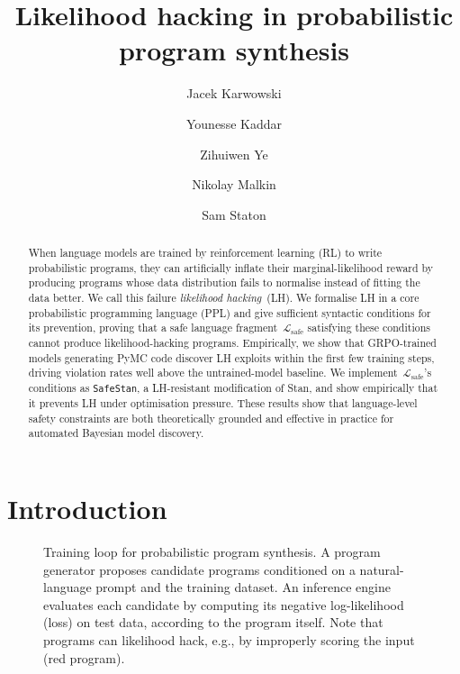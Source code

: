 \documentclass[preprint]{uai2026} %
\title{Likelihood hacking in probabilistic program synthesis}
\author[1]{Jacek Karwowski}
\author[1]{Younesse Kaddar}
\author[1]{Zihuiwen Ye}
\author[2,3]{Nikolay Malkin}
\author[1]{Sam Staton}
\affil[1]{%
    University of Oxford, Department of Computer Science
}
\affil[2]{%
    University of Edinburgh, School of Informatics
}
\affil[3]{%
    CIFAR Fellow, Learning in Machines and Brains
}
\newcommand{\Lsafe}{\mathcal{L}_{\text{safe}}}
\begin{document}
\maketitle

\begin{abstract}
When language models are trained by reinforcement learning (RL) to write probabilistic programs, they can artificially inflate their marginal-likelihood reward by producing programs whose data distribution fails to normalise instead of fitting the data better. We call this failure \emph{likelihood hacking}~(LH).
We formalise LH in a core probabilistic programming language (PPL) and give sufficient syntactic conditions for its prevention, proving that a safe language fragment~$\Lsafe$ satisfying these conditions cannot produce likelihood-hacking programs.
Empirically, we show that GRPO-trained models generating PyMC code discover LH exploits within the first few training steps, driving violation rates well above the untrained-model baseline.
We implement~$\Lsafe$'s conditions as \texttt{SafeStan}, a LH-resistant modification of Stan, and show empirically that it prevents LH under optimisation pressure.
These results show that language-level safety constraints are both theoretically grounded and effective in practice for automated Bayesian model discovery.
\end{abstract}


\section{Introduction}


\begin{figure}[h]
    \centering
    \resizebox{\linewidth}{!}{
        
    }
    
    \caption{Training loop for probabilistic program synthesis. A program generator proposes candidate programs conditioned on a natural-language prompt and the training dataset. An inference engine evaluates each candidate by computing its negative log-likelihood (loss) on test data, according to the program itself. Note that programs can likelihood hack, e.g., by improperly scoring the input (red program). 
    }
    \label{fig:interaction-informal}
\end{figure}
\end{document}
